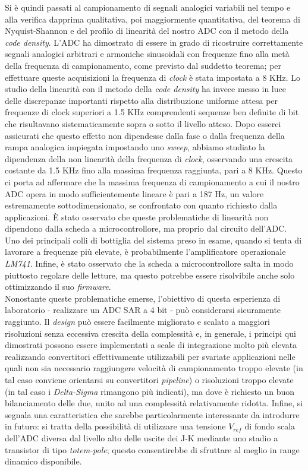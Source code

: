 \documentclass[journal]{IEEEtran}
\begin{document}
Si è quindi passati al campionamento di segnali analogici variabili nel tempo e alla verifica dapprima qualitativa, poi maggiormente quantitativa, del teorema di Nyquist-Shannon e del profilo di linearità del nostro ADC con il metodo della \textit{code density}. L'ADC ha dimostrato di essere in grado di ricostruire correttamente segnali analogici arbitrari e armoniche sinusoidali con frequenze fino alla metà della frequenza di campionamento, come previsto dal suddetto teorema; per effettuare queste acquisizioni la frequenza di \textit{clock} è stata impostata a 8 KHz. Lo studio della linearità con il metodo della \textit{code density} ha invece messo in luce delle discrepanze importanti rispetto alla distribuzione uniforme attesa per frequenze di clock superiori a 1.5 KHz comprendenti sequenze ben definite di bit che risultavano sistematicamente sopra o sotto il livello atteso. Dopo esserci assicurati che questo effetto non dipendesse dalla fase o dalla frequenza della rampa analogica impiegata impostando uno \textit{sweep}, abbiamo studiato la dipendenza della non linearità della frequenza di \textit{clock}, osservando una crescita costante da 1.5 KHz fino alla massima frequenza raggiunta, pari a 8 KHz. Questo ci porta ad affermare che la massima frequenza di campionamento a cui il nostro ADC opera in modo sufficientemente lineare è pari a 187 Hz, un valore estremamente sottodimensionato, se confrontato con quanto richiesto dalla applicazioni. È stato osservato che queste problematiche di linearità non dipendono dalla scheda a microcontrollore, ma proprio dal circuito dell'ADC. Uno dei principali colli di bottiglia del sistema preso in esame, quando si tenta di lavorare a frequenze più elevate, è probabilmente l'amplificatore operazionale \textit{LM741}. Infine, è stato osservato che la scheda a microcontrollore salta in modo piuttosto regolare delle letture, ma questo potrebbe essere risolvibile anche solo ottimizzando il suo \textit{firmware}.
\\

Nonostante queste problematiche emerse, l'obiettivo di questa esperienza di laboratorio - realizzare un ADC SAR a 4 bit - può considerarsi sicuramente raggiunto. Il \textit{design} può essere facilmente migliorato e scalato a maggiori risoluzioni senza eccessiva crescita della complessità e, in generale, i principi qui dimostrati possono essere implementati a scale di integrazione molto più elevata realizzando convertitori effettivamente utilizzabili per svariate applicazioni nelle quali non sia necessario raggiungere velocità di campionamento troppo elevate (in tal caso conviene orientarsi su convertitori \textit{pipeline}) o risoluzioni troppo elevate (in tal caso i \textit{Delta-Sigma} rimangono più indicati), ma dove è richiesto un buon bilanciamento delle due, unito ad una complessità relativamente ridotta. Infine, si segnala una caratteristica che sarebbe particolarmente interessante da introdurre in futuro: si tratta della possibilità di utilizzare una tensione $V_{ref}$ di fondo scala dell'ADC diversa dal livello alto delle uscite dei J-K mediante uno stadio a transistor di tipo \textit{totem-pole}; questo consentirebbe di sfruttare al meglio in range dinamico disponibile.
\\
\end{document}
